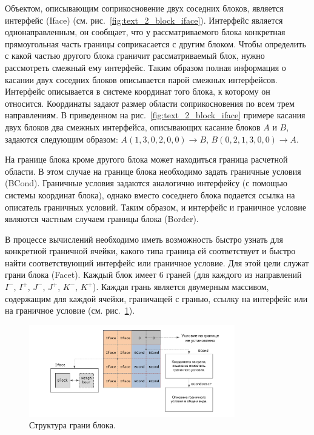 Объектом, описывающим соприкосновение двух соседних блоков, является интерфейс (Iface) (см. рис.~\ref{fig:text_2_block_iface}).
Интерфейс является однонаправленным, он сообщает, что у рассматриваемого блока конкретная прямоугольная часть границы соприкасается с другим блоком.
Чтобы определить с какой частью другого блока граничит рассматриваемый блок, нужно рассмотреть смежный ему интерфейс.
Таким образом полная информация о касании двух соседних блоков описывается парой смежных интерфейсов.
Интерфейс описывается в системе координат того блока, к которому он относится.
Координаты задают размер области соприкосновения по всем трем направлениям.
В приведенном на рис.~\ref{fig:text_2_block_iface} примере касания двух блоков два смежных интерфейса, описывающих касание блоков $A$ и $B$, задаются следующим образом: $A(1, 3, 0, 2, 0, 0) \rightarrow B$, $B(0, 2, 1, 3, 0, 0) \rightarrow A$.

На границе блока кроме другого блока может находиться граница расчетной области.
В этом случае на границе блока необходимо задать граничные условия (BCond).
Граничные условия задаются аналогично интерфейсу (с помощью системы координат блока), однако вместо соседнего блока подается ссылка на описатель граничных условий.
Таким образом, и интерфейс и граничное условие являются частным случаем границы блока (Border).

В процессе вычислений необходимо иметь возможность быстро узнать для конкретной граничной ячейки, какого типа граница ей соответствует и быстро найти соответствующий интерфейс или граничное условие.
Для этой цели служат грани блока (Facet).
Каждый блок имеет 6 граней (для каждого из направлений $I^{-}$, $I^{+}$, $J^{-}$, $J^{+}$, $K^{-}$, $K^{+}$).
Каждая грань является двумерным массивом, содержащим для каждой ячейки, граничащей с гранью, ссылку на интерфейс или на граничное условие (см. рис.~\ref{fig:text_2_block_facet}).

\begin{figure}[ht]
\centering
\includegraphics[width=0.8\textwidth]{fig/par_8-facet.pdf}
\singlespacing
{}\caption{Структура грани блока.}
\label{fig:text_2_block_facet}
\end{figure}

